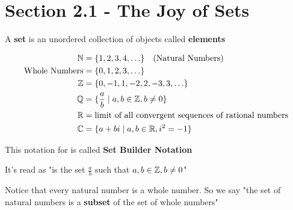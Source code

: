 \documentclass[../../Main.tex]{subfiles}
\begin{document}
\section{Section 2.1 - The Joy of Sets}

\begin{definition}
    A \textbf{set} is an unordered collection of objects called \textbf{elements}
\end{definition}

\begin{align*}
    \mathbb{N} &= \{ 1, 2, 3, 4, \ldots  \} \quad \text{(Natural Numbers)} \\
    \text{Whole Numbers} &= \{ 0, 1, 2, 3, \ldots \} \\
    \mathbb{Z} &= \{ 0, -1, 1, -2, 2, -3, 3, \ldots \} \\
    \mathbb{Q} &= \{  \frac{a}{b} \mid a, b \in \mathbb{Z}, b \not = 0 \} \\
    \mathbb{R} &= \text{limit of all convergent sequences of rational numbers} \\
    \mathbb{C} &= \{ a + bi \mid a, b \in \mathbb{R}, i^2 = -1 \}
\end{align*}

\begin{note}
    This notation for \setQ is called \textbf{Set Builder Notation}

    \noindent It's read as "\setQ is the set $\frac{a}{b}$ such that $a, b \in \mathbb{Z}, b \not = 0$"
\end{note}

\begin{note}
    Notice that every natural number is a whole number. So we say "the set of natural numbers is a \textbf{subset} of the set of whole numbers"
\end{note}
\end{document}
